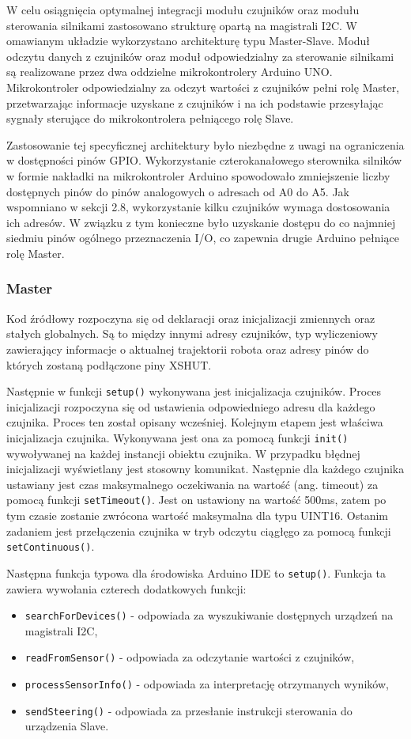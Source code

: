 \documentclass{report}
\begin{document}
W celu osiągnięcia optymalnej integracji modułu czujników oraz modułu sterowania silnikami zastosowano strukturę opartą na magistrali I2C. W omawianym układzie wykorzystano architekturę typu Master-Slave. Moduł odczytu danych z czujników oraz moduł odpowiedzialny za sterowanie silnikami są realizowane przez dwa oddzielne mikrokontrolery Arduino UNO. Mikrokontroler odpowiedzialny za odczyt wartości z czujników pełni rolę Master, przetwarzając informacje uzyskane z czujników i na ich podstawie przesyłając sygnały sterujące do mikrokontrolera pełniącego rolę Slave.

Zastosowanie tej specyficznej architektury było niezbędne z uwagi na ograniczenia w dostępności pinów GPIO. Wykorzystanie czterokanałowego sterownika silników w formie nakładki na mikrokontroler Arduino spowodowało zmniejszenie liczby dostępnych pinów do pinów analogowych o adresach od A0 do A5. Jak wspomniano w sekcji 2.8, wykorzystanie kilku czujników wymaga dostosowania ich adresów. W związku z tym konieczne było uzyskanie dostępu do co najmniej siedmiu pinów ogólnego przeznaczenia I/O, co zapewnia drugie Arduino pełniące rolę Master.

\subsubsection{\large Master}

Kod źródłowy rozpoczyna się od deklaracji oraz inicjalizacji zmiennych oraz stałych globalnych. Są to między innymi adresy czujników, typ wyliczeniowy zawierający informacje o aktualnej trajektorii robota oraz adresy pinów do których zostaną podłączone piny XSHUT. 

Następnie w funkcji \texttt{setup()} wykonywana jest inicjalizacja czujników. Proces inicjalizacji rozpoczyna się od ustawienia odpowiedniego adresu dla każdego czujnika. Proces ten został opisany wcześniej. Kolejnym etapem jest właściwa inicjalizacja czujnika. Wykonywana jest ona za pomocą funkcji \texttt{init()} wywoływanej na każdej instancji obiektu czujnika. W przypadku błędnej inicjalizacji wyświetlany jest stosowny komunikat. Następnie dla każdego czujnika ustawiany jest czas maksymalnego oczekiwania na wartość (ang. timeout) za pomocą funkcji \texttt{setTimeout()}. Jest on ustawiony na wartość 500ms, zatem po tym czasie zostanie zwrócona wartość maksymalna dla typu UINT16. Ostanim zadaniem jest przełączenia czujnika w tryb odczytu ciągłęgo za pomocą funkcji \texttt{setContinuous()}.


Następna funkcja typowa dla środowiska Arduino IDE to \texttt{setup()}. Funkcja ta zawiera wywołania czterech dodatkowych funkcji:
\begin{itemize}
    \item \texttt{searchForDevices()} - odpowiada za wyszukiwanie dostępnych urządzeń na magistrali I2C,
    \item \texttt{readFromSensor()} - odpowiada za odczytanie wartości z czujników,
    \item \texttt{processSensorInfo()} - odpowiada za interpretację otrzymanych wyników,
    \item \texttt{sendSteering()} - odpowiada za przesłanie instrukcji sterowania do urządzenia Slave.
\end{itemize}
\end{document}
